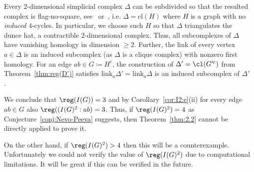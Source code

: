   Every $2$-dimensional simplicial complex $\Delta$ can be subdivided so that the resulted complex is flag-no-square, see~\cite{Dr} or~\cite[Lem. 2.3]{PS}, i.e. $\Delta=\text{cl}(H)$ where $H$ is a graph with no \emph{induced} $4$-cycles. In particular,
we choose such $H$ so that $\Delta$ triangulates the dunce hat, a contractible $2$-dimensional complex.
Thus, all subcomplexes of $\Delta$ have vanishing homology in dimension $\ge 2$. Further, the link of every vertex $a\in \Delta$ is an induced subcomplex (as $\Delta$ is a clique complex) with nonzero first homology. For an edge $ab\in G\coloneqq H^c$, the construction of $\Delta'=\cl(G'^c)$ from  Theorem~\ref{thm:reg(D')} satisfies $\text{link}_a \Delta'=\text{link}_a \Delta$ is an induced subcomplex of $\Delta'$.

We conclude that $\reg(I(G))=3$ and by Corollary~\ref{cor:I2:e}(ii)
for every edge $ab\in G$ also $\reg((I(G)^2:ab)=3$.
Thus, if $\reg(I(G)^2)=4$ as Conjecture~\ref{conj:Nevo-Peeva} suggests, then Theorem~\ref{thm:2.2} cannot be directly applied to prove it.

On the other hand, if $\reg(I(G)^2)>4$ then this will be a counterexample. Unfortunately we could not verify the value of $\reg(I(G)^2)$ due to computational limitations. It will be great if this can be verified in the future.



